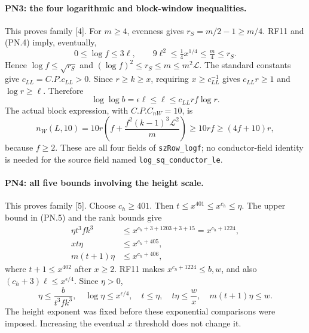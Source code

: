 \paragraph{PN3: the four logarithmic and block-window inequalities.}
This proves family [4]. For $m\geq4$, evenness gives
$r_S=m/2-1\geq m/4$. RF11 and (PN.4) imply, eventually,
\[
 0\leq\log f\leq3\ell,\qquad
 9\ell^2\leq\tfrac14x^{1/4}\leq\tfrac m4\leq r_S.
                                                               \tag{PN.10}
\]
Hence $\log f\leq\sqrt{r_S}$ and
$(\log f)^2\leq r_S\leq m\leq m^2\mathcal L$.
The standard constants give $c_{LL}=C.P.c_{LL}>0$.
Since $r\geq k\geq x$, requiring $x\geq c_{LL}^{-1}$ gives
$c_{LL}r\geq1$ and $\log r\geq\ell$. Therefore
\[
 \log\log b=\epsilon\ell\leq\ell
                    \leq c_{LL}rf\log r.                    \tag{PN.11}
\]
The actual block expression, with $C.P.C_{nW}=10$, is
\[
 n_W(L,10)=10r\left(f+\frac{f^2(k-1)^3\mathcal L^2}{m}\right)
             \geq10rf\geq(4f+10)r,                         \tag{PN.12}
\]
because $f\geq2$. These are all four fields of
\texttt{szRow\_logf}; no conductor-field identity is needed for the
source field named \texttt{log\_sq\_conductor\_le}.

\paragraph{PN4: all five bounds involving the height scale.}
This proves family [5]. Choose $c_h\geq401$. Then
$t\leq x^{401}\leq x^{c_h}\leq\eta$.
The upper bound in (PN.5) and the rank bounds give
\begin{align*}
 \eta t^3fk^3&\leq x^{c_h+3+1203+3+15}=x^{c_h+1224},\\
 xt\eta&\leq x^{c_h+405},\\
 m(t+1)\eta&\leq x^{c_h+406},
\end{align*}
where $t+1\leq x^{402}$ after $x\geq2$.
RF11 makes $x^{c_h+1224}\leq b,w$, and also
$(c_h+3)\ell\leq x^{\epsilon/4}$. Since $\eta>0$,
\[
 \boxed{\quad
 \eta\leq\frac{b}{t^3fk^3},\quad
 \log\eta\leq x^{\epsilon/4},\quad
 t\leq\eta,\quad t\eta\leq\frac wx,\quad
 m(t+1)\eta\leq w.\quad}                                  \tag{PN.13}
\]
The height exponent was fixed before these exponential comparisons
were imposed. Increasing the eventual $x$ threshold does not change it.

